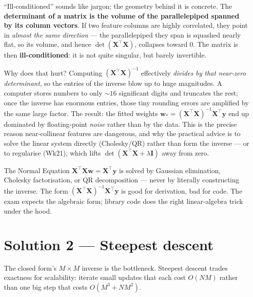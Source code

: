 \documentclass[11pt, a4paper]{article}
\begin{document}
\begin{notebox}
``Ill-conditioned'' sounds like jargon; the geometry behind it is concrete. The \textbf{determinant of a matrix is the volume of the parallelepiped spanned by its column vectors}. If two feature columns are highly correlated, they point in \emph{almost the same direction} — the parallelepiped they span is squashed nearly flat, so its volume, and hence $\det(\mathbf{X}^\top\mathbf{X})$, collapses toward $0$. The matrix is then \textbf{ill-conditioned}: it is not quite singular, but barely invertible.

Why does that hurt? Computing $(\mathbf{X}^\top\mathbf{X})^{-1}$ effectively \emph{divides by that near-zero determinant}, so the entries of the inverse blow up to huge magnitudes. A computer stores numbers to only $\sim 16$ significant digits and truncates the rest; once the inverse has enormous entries, those tiny rounding errors are amplified by the same large factor. The result: the fitted weights $\mathbf{w}_* = (\mathbf{X}^\top\mathbf{X})^{-1}\mathbf{X}^\top\mathbf{y}$ end up dominated by floating-point \emph{noise} rather than by the data. This is the precise reason near-collinear features are dangerous, and why the practical advice is to solve the linear system directly (Cholesky/QR) rather than form the inverse — or to regularise (Wk21), which lifts $\det(\mathbf{X}^\top\mathbf{X}+\lambda\mathbf{I})$ away from zero.
\end{notebox}

\begin{pitfallbox}
The Normal Equation $\mathbf{X}^\top\mathbf{X}\mathbf{w} = \mathbf{X}^\top\mathbf{y}$ is solved by Gaussian elimination, Cholesky factorisation, or QR decomposition — never by literally constructing the inverse. The form $(\mathbf{X}^\top\mathbf{X})^{-1}\mathbf{X}^\top\mathbf{y}$ is good for derivation, bad for code. The exam expects the algebraic form; library code does the right linear-algebra trick under the hood.
\end{pitfallbox}

\section{Solution 2 — Steepest descent}

The closed form's $M\times M$ inverse is the bottleneck. Steepest descent trades exactness for scalability: iterate small updates that each cost $O(NM)$ rather than one big step that costs $O(M^3 + NM^2)$.
\end{document}
